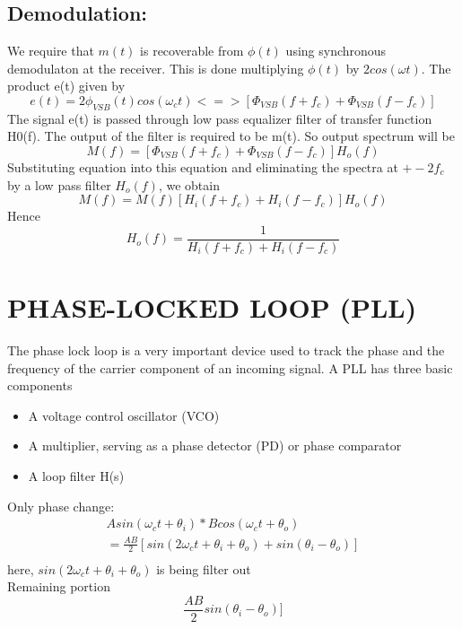\documentclass{article}
\begin{document}
\subsection{Demodulation:}

We require that  $m(t)$ is recoverable from $\phi(t)$ using synchronous demodulaton at the receiver. This is done multiplying $\phi(t)$ by $2cos(\omega t)$. The product e(t) given by 
\begin{equation}
    e(t) = 2\phi_{VSB}(t)cos(\omega_ct) <=> [\Phi_{VSB}(f+f_c) + \Phi_{VSB}(f-f_c)]
\end{equation}
The signal e(t) is passed through low pass equalizer filter  of transfer function H0(f). The output of the filter is required to be m(t). So output spectrum will be
\begin{equation}
    M(f) = [\Phi_{VSB}(f+f_c) + \Phi_{VSB}(f-f_c)]H_o(f)
\end{equation}
Substituting equation into this equation and eliminating the spectra at $+-2f_c$ by a low pass filter $H_o(f)$, we obtain 
\begin{equation}
    M(f) = M(f)[H_i(f+f_c) + H_i(f-f_c)]H_o(f)
\end{equation}
Hence
\begin{equation}
    H_o(f) = \frac{1}{H_i(f+f_c) + H_i(f-f_c)}
\end{equation}

\section{PHASE-LOCKED LOOP (PLL)}
The phase lock loop is a very important device used to track the phase and the frequency of the carrier component of an incoming signal. A PLL has three basic components

\begin{itemize}
    \item A voltage control oscillator (VCO)
    \item A multiplier, serving as a phase detector (PD)
    or phase comparator
    \item A loop filter H(s)  
\end{itemize}

Only phase change:
\begin{equation}
    \begin{split}
        Asin(\omega_ct+\theta_i) * Bcos(\omega_ct+\theta_o)\\
        =\frac{AB}{2}[sin(2\omega_ct+\theta_i+\theta_o) + sin(\theta_i-\theta_o)]\\
    \end{split}
\end{equation}
here, $sin(2\omega_ct+\theta_i+\theta_o)$ is being filter out \\
Remaining portion
\begin{equation}
    \frac{AB}{2}sin(\theta_i-\theta_o)]
\end{equation}
\end{document}
